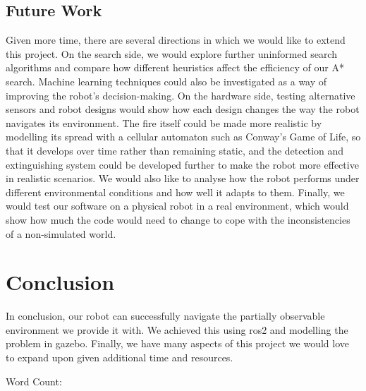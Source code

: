 \documentclass[12pt,a4paper,twoside]{article}
\begin{document}
\subsection{Future Work}
Given more time, there are several directions in which we would like to extend this project. 
On the search side, we would explore further uninformed search algorithms and compare how different heuristics affect the efficiency of our A* search.
Machine learning techniques could also be investigated as a way of improving the robot's decision-making. 
On the hardware side, testing alternative sensors and robot designs would show how each design changes the way the robot navigates its environment.
The fire itself could be made more realistic by modelling its spread with a cellular automaton such as Conway's Game of Life, 
so that it develops over time rather than remaining static, and the detection and extinguishing system could be developed further to make the robot more effective in realistic scenarios.
We would also like to analyse how the robot performs under different environmental conditions and how well it adapts to them. 
Finally, we would test our software on a physical robot in a real environment, which would show how much the code would need to change to cope with the inconsistencies of a non-simulated world.

\section{Conclusion}
In conclusion, our robot can successfully navigate the partially observable environment we provide it with. 
We achieved this using ros2 and modelling the problem in gazebo. 
Finally, we have many aspects of this project we would love to expand upon given additional time and resources. 
\clearpage
\printbibliography



Word Count: 
\end{document}
